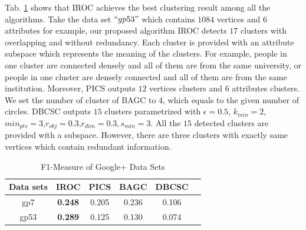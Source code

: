 Tab. \ref{tab:fmeasuregp} shows that IROC achieves the best clustering result among all the algorithms. Take the data set $``gp53"$ which contains $1084$ vertices and $6$ attributes for example, our proposed algorithm IROC detects $17$ clusters with overlapping and without redundancy. Each cluster is provided with an attribute subspace which represents the meaning of the clusters. For example, people in one cluster are connected densely and all of them are from the same university, or people in one cluster are densely connected and all of them are from the same institution. Moreover, PICS outputs $12$ vertices clusters and $6$ attributes clusters. We set the number of cluster of BAGC to $4$, which equals to the given number of circles. DBCSC outputs $15$ clusters parametrized with $\epsilon=0.5$, $k_{min}=2$, $min_{pts}=3$,$r_{obj}=0.3$,$r_{dim}=0.3,s_{min}=3$. All the $15$ detected clusters are provided with a subspace. However, there are three clusters with exactly same vertices which contain redundant information.
\begin{table}[t]
\center\caption{F1-Measure of Google+ Data Sets }
\begin{tabular}{|c|c|c|c|c|c|}
\hline
Data sets & IROC  & PICS & BAGC & DBCSC \\
\hline
gp7 & \textbf{0.248} & 0.205 & 0.236 & 0.106\\
\hline
gp53 & \textbf{0.289} & 0.125 & 0.130& 0.074\\
\hline
\end{tabular}
\label{tab:fmeasuregp}
\end{table}